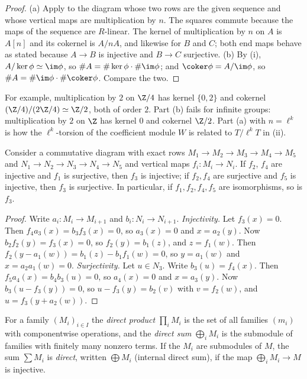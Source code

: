 \begin{proof}
(a) Apply  to the diagram whose two rows are the given sequence and whose vertical maps are
multiplication by $n$. The squares commute because the maps of the sequence are $R$-linear. The kernel of multiplication by $n$
on $A$ is $A[n]$ and its cokernel is $A/nA$, and likewise for $B$ and $C$; both end maps behave as
stated because $A\to B$ is injective and $B\to C$ surjective. (b) By (i), $A/\ker\phi\simeq\im\phi$, so
$\#A=\#\ker\phi\cdot\#\im\phi$; and $\coker\phi=A/\im\phi$, so $\#A=\#\im\phi\cdot\#\coker\phi$. Compare the two.
\end{proof}

For example, multiplication by $2$ on $\Z/4$ has kernel $\{0,2\}$ and cokernel $(\Z/4)/(2\Z/4)\simeq\Z/2$, both of order $2$. Part (b)
fails for infinite groups: multiplication by $2$ on $\Z$ has kernel $0$ and cokernel $\Z/2$. Part (a) with $n=\ell^k$ is how the
$\ell^k$-torsion of the coefficient module $W$ is related to $T/\ell^kT$ in (ii).

\begin{lemma}\label{lem:modules:five}
Consider a commutative diagram with exact rows $M_1\to M_2\to M_3\to M_4\to M_5$ and $N_1\to N_2\to N_3\to N_4\to N_5$ and
vertical maps $f_i\colon M_i\to N_i$. If $f_2$, $f_4$ are injective and $f_1$ is surjective, then $f_3$ is injective; if $f_2,f_4$
are surjective and $f_5$ is injective, then $f_3$ is surjective. In particular, if $f_1,f_2,f_4,f_5$ are isomorphisms, so is $f_3$.
\end{lemma}

\begin{proof}
Write $a_i\colon M_i\to M_{i+1}$ and $b_i\colon N_i\to N_{i+1}$. \emph{Injectivity.} Let $f_3(x)=0$. Then $f_4a_3(x)=b_3f_3(x)=0$, so
$a_3(x)=0$ and $x=a_2(y)$. Now $b_2f_2(y)=f_3(x)=0$, so $f_2(y)=b_1(z)$, and $z=f_1(w)$. Then $f_2(y-a_1(w))=b_1(z)-b_1f_1(w)=0$, so
$y=a_1(w)$ and $x=a_2a_1(w)=0$. \emph{Surjectivity.} Let $u\in N_3$. Write $b_3(u)=f_4(x)$. Then $f_5a_4(x)=b_4b_3(u)=0$, so $a_4(x)=0$
and $x=a_3(y)$. Now $b_3(u-f_3(y))=0$, so $u-f_3(y)=b_2(v)$ with $v=f_2(w)$, and $u=f_3(y+a_2(w))$.
\end{proof}

\begin{definition}\label{def:modules:sums-products}
For a family $(M_i)_{i\in I}$ the \emph{direct product} $\prod_iM_i$ is the set of all families $(m_i)$ with componentwise
operations, and the \emph{direct sum} $\bigoplus_iM_i$ is the submodule of families with finitely many nonzero terms. If the
$M_i$ are submodules of $M$, the sum $\sum M_i$ is \emph{direct}, written $\bigoplus M_i$ (internal direct sum), if the map
$\bigoplus_iM_i\to M$ is injective.
\end{definition}

